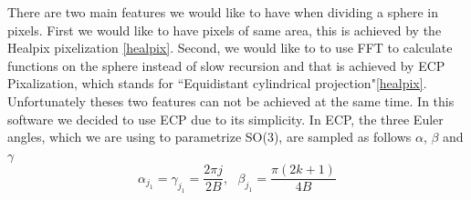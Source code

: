 \documentclass[12pt]{article}
\begin{document}
There are two main features we would like to have when dividing a sphere in
pixels. First we would like to have pixels of same area, this is achieved by the
Healpix pixelization \ref{healpix}. Second, we would like to to use FFT to calculate
functions on the sphere instead of slow recursion and that is achieved by ECP
Pixalization, which stands for ``Equidistant cylindrical projection"\ref{healpix}.
Unfortunately theses two features can not be achieved at the same time. In this software we
decided to use ECP due to its simplicity. In ECP, the three Euler angles, which we 
are using to parametrize SO(3), are sampled as follows
$\alpha$, $\beta$ and $\gamma$
\begin{equation}
\alpha_{j_1} = \gamma_{j_1} = \frac{2\pi j}{2B}, \ \ \ \beta_{j_1} = \frac{\pi(2k + 1)}{4B}
\nonumber
\end{equation}
\end{document}
